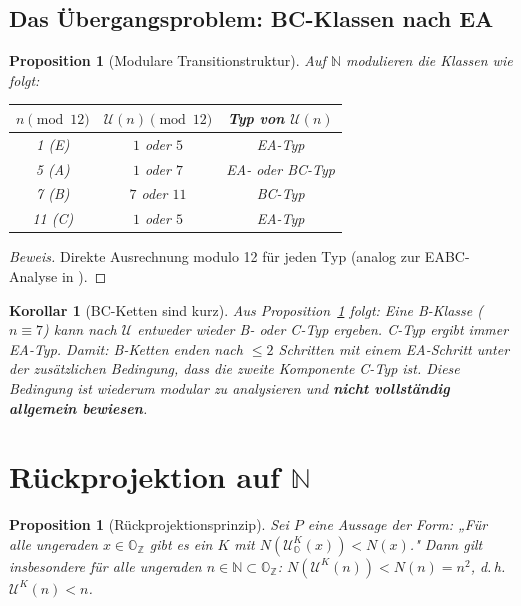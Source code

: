 \documentclass[12pt,a4paper]{article}
\newtheorem{proposition}[definition]{Proposition}
\newtheorem{korollar}[definition]{Korollar}
\newenvironment{beweis}{\begin{proof}[Beweis]}{\end{proof}}
\newcommand{\U}{\mathcal{U}}       %
\newcommand{\OZ}{\mathbb{O}_{\mathbb{Z}}}  %
\newcommand{\Norm}[1]{N(#1)}       %
\newcommand{\N}{\mathbb{N}}
\newcommand{\Uo}{\mathcal{U}_{\mathbb{O}}} %
\begin{document}
\subsection{Das Übergangsproblem: BC-Klassen nach EA}

\begin{proposition}[Modulare Transitionstruktur]\label{prop:transition}
Auf $\N$ modulieren die Klassen wie folgt:
\begin{center}
\renewcommand{\arraystretch}{1.3}
\begin{tabular}{ccc}
\toprule
$n \pmod{12}$ & $\U(n) \pmod{12}$ & Typ von $\U(n)$\\
\midrule
1 (E)  & $1$ oder $5$            & EA-Typ\\
5 (A)  & $1$ oder $7$            & EA- oder BC-Typ\\
7 (B)  & $7$ oder $11$           & BC-Typ\\
11 (C) & $1$ oder $5$            & EA-Typ\\
\bottomrule
\end{tabular}
\end{center}
\end{proposition}

\begin{beweis}
Direkte Ausrechnung modulo 12 für jeden Typ (analog zur EABC-Analyse
in \cite{collatz-eabc}).
\end{beweis}

\begin{korollar}[BC-Ketten sind kurz]
Aus Proposition~\ref{prop:transition} folgt: Eine B-Klasse
($n \equiv 7$) kann nach $\U$ entweder wieder B- oder C-Typ ergeben.
C-Typ ergibt immer EA-Typ. Damit: B-Ketten enden nach $\leq 2$ Schritten
mit einem EA-Schritt \emph{unter der zusätzlichen Bedingung, dass die
zweite Komponente C-Typ ist}. Diese Bedingung ist wiederum modular
zu analysieren und \textbf{nicht vollständig allgemein bewiesen}.
\end{korollar}

\section{Rückprojektion auf \texorpdfstring{$\N$}{N}}

\begin{proposition}[Rückprojektionsprinzip]\label{prop:rückprojektion}
Sei $P$ eine Aussage der Form: „Für alle ungeraden $x \in \OZ$ gibt es
ein $K$ mit $\Norm{\Uo^K(x)} < \Norm{x}$."
Dann gilt insbesondere für alle ungeraden $n \in \N \subset \OZ$:
$\Norm{\U^K(n)} < \Norm{n} = n^2$, d.\,h.\ $\U^K(n) < n$.
\end{proposition}
\end{document}
